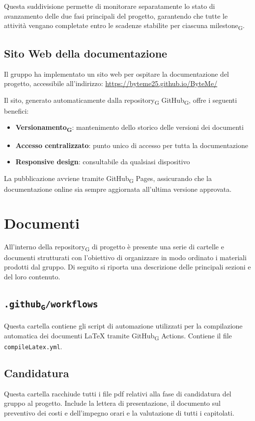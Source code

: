 \documentclass[11pt,a4paper]{article}
\newcommand{\gls}[1]{#1\textsubscript{G}}
\begin{document}
Questa suddivisione permette di monitorare separatamente lo stato di avanzamento delle due fasi principali del progetto, garantendo che tutte le attività vengano completate entro le scadenze stabilite per ciascuna \gls{milestone}.


\subsection{Sito Web della documentazione}
Il gruppo ha implementato un sito web per ospitare la documentazione del progetto, accessibile all'indirizzo: \url{https://byteme25.github.io/ByteMe/}

Il sito, generato automaticamente dalla \gls{repository} \gls{GitHub}, offre i seguenti benefici:
\begin{itemize}
    \item \textbf{\gls{Versionamento}}: mantenimento dello storico delle versioni dei documenti
    \item \textbf{Accesso centralizzato}: punto unico di accesso per tutta la documentazione
    \item \textbf{Responsive design}: consultabile da qualsiasi dispositivo
\end{itemize}

La pubblicazione avviene tramite \gls{GitHub} Pages, assicurando che la documentazione online sia sempre aggiornata all'ultima versione approvata.

\newpage

\section{Documenti}
All’interno della \gls{repository} di progetto è presente una serie di cartelle e documenti strutturati con l’obiettivo di organizzare in modo ordinato i materiali prodotti dal gruppo. Di seguito si riporta una descrizione delle principali sezioni e del loro contenuto.

\subsection{\texttt{.\gls{github}/workflows}}
Questa cartella contiene gli script di automazione utilizzati per la compilazione automatica dei documenti LaTeX tramite \gls{GitHub} Actions. 
Contiene il file \texttt{compileLatex.yml}.

\subsection{Candidatura}
Questa cartella racchiude tutti i file pdf relativi alla fase di candidatura del gruppo al progetto. Include la lettera di presentazione, il documento sul preventivo dei costi e dell'impegno orari e la valutazione di tutti i capitolati.
\end{document}
